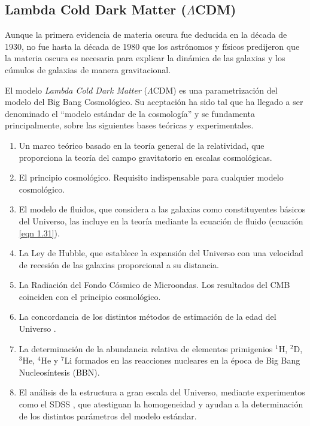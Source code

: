 \documentclass[a4paper,openright,12pt]{book}
\begin{document}



\subsection{Lambda Cold Dark Matter ($\Lambda$CDM)}
Aunque la primera evidencia de materia oscura fue deducida en la década de 1930, no fue hasta la década de 1980 que los astrónomos y físicos predijeron que la materia oscura es necesaria para explicar la dinámica de las galaxias y los cúmulos de galaxias de manera gravitacional.

El modelo \textit{Lambda Cold Dark Matter} ($\Lambda$CDM) es una parametrización del modelo del Big Bang Cosmológico. Su aceptación ha sido tal que ha llegado a ser denominado  el ``modelo estándar de la cosmología'' y se  fundamenta principalmente, sobre las siguientes bases teóricas y experimentales. 
\begin{enumerate}
\item Un marco teórico basado en la teoría general de la relatividad, que proporciona la teoría del campo gravitatorio en escalas cosmológicas.
\item El principio cosmológico. Requisito indispensable para cualquier modelo cosmológico.
\item El modelo de fluidos, que considera a las galaxias como constituyentes básicos del Universo, las incluye en la teoría mediante la ecuación de fluido (ecuación \ref{eqn 1.31}).
\item La Ley de Hubble, que establece la expansión del Universo con una velocidad de recesión de las galaxias proporcional a su distancia.
\item La Radiación del Fondo Cósmico de Microondas. Los resultados del CMB coinciden con el principio cosmológico.
\item La concordancia de los distintos métodos de estimación de la edad del Universo \cite{1.1.5}. 
\item La determinación de la abundancia relativa de elementos primigenios $^{1}$H, $^{2}$D, $^{3}$He, $^{4}$He y $^{7}$Li formados en las reacciones nucleares en la época de Big Bang Nucleosíntesis (BBN)\cite{1.1.6, 1.1.7, 1.1.8}.
\item El análisis de la estructura a gran escala del Universo, mediante experimentos como el SDSS \cite{1.1.9} , que atestiguan la homogeneidad y ayudan a la determinación de los distintos parámetros del modelo estándar.

\end{enumerate}
\end{document}
